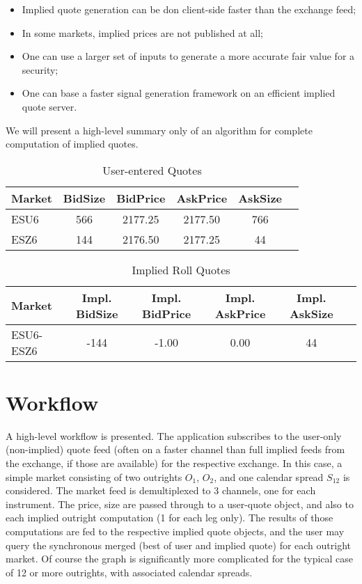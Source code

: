 \documentclass{article}
\begin{document}
\begin{itemize}
\item Implied quote generation can be don client-side faster than the exchange feed;
\item In some markets, implied prices are not published at all;
\item One can use a larger set of inputs to generate a more accurate fair value for a security;
\item One can base a faster signal generation framework on an efficient implied quote server.
\end{itemize}

We will present a high-level summary only of an algorithm for complete computation of implied quotes.

\clearpage
\begin{table}
\centering
\begin{tabular}{|l|c|c|c|c|c|}
\hline
Market & BidSize & BidPrice & AskPrice & AskSize\\
\hline
ESU6 & 566 & 2177.25 & 2177.50 & 766 \\
ESZ6 & 144 & 2176.50 & 2177.25 & 44 \\
\hline
\end{tabular}
\caption{User-entered Quotes}
\label{tab:template}
\end{table}

\begin{table}
\centering
\begin{tabular}{|l|c|c|c|c|c|}
\hline
Market & Impl. BidSize & Impl. BidPrice & Impl. AskPrice & Impl. AskSize\\
\hline
ESU6-ESZ6 & -144 & -1.00   & 0.00  & 44 \\
\hline
\end{tabular}
\caption{Implied Roll Quotes}
\label{tab:template}
\end{table}


\section*{Workflow}
A high-level workflow is presented. The application subscribes to the user-only (non-implied) quote feed (often on a faster channel than full implied feeds from the exchange, if those are available)  for the respective exchange. In this case, a simple market consisting of two outrights $O_1$, $O_2$, and one calendar spread $S_12$ is considered. The market feed is demultiplexed to 3 channels, one for each instrument. The price, size are passed through to a user-quote object, and also to each implied outright computation (1 for each leg only). The results of those computations are fed to the respective implied quote objects, and the user may query the synchronous merged (best of user and implied quote) for each outright market. Of course the graph is significantly more complicated for the typical case of 12 or more outrights, with associated calendar spreads.
\end{document}

